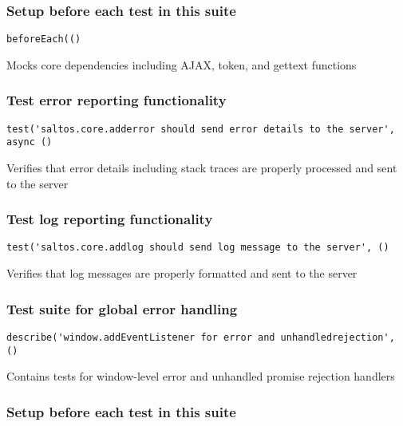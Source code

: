 \documentclass[a4paper]{article}
\begin{document}
\hypertarget{toc483}{}
\subsubsection{Setup before each test in this suite}

\begin{lstlisting}
beforeEach(()
\end{lstlisting}

Mocks core dependencies including AJAX, token, and gettext functions

\hypertarget{toc484}{}
\subsubsection{Test error reporting functionality}

\begin{lstlisting}
test('saltos.core.adderror should send error details to the server', async ()
\end{lstlisting}

Verifies that error details including stack traces are properly
processed and sent to the server

\hypertarget{toc485}{}
\subsubsection{Test log reporting functionality}

\begin{lstlisting}
test('saltos.core.addlog should send log message to the server', ()
\end{lstlisting}

Verifies that log messages are properly formatted and sent to the server

\hypertarget{toc486}{}
\subsubsection{Test suite for global error handling}

\begin{lstlisting}
describe('window.addEventListener for error and unhandledrejection', ()
\end{lstlisting}

Contains tests for window-level error and unhandled promise rejection handlers

\hypertarget{toc487}{}
\subsubsection{Setup before each test in this suite}
\end{document}
